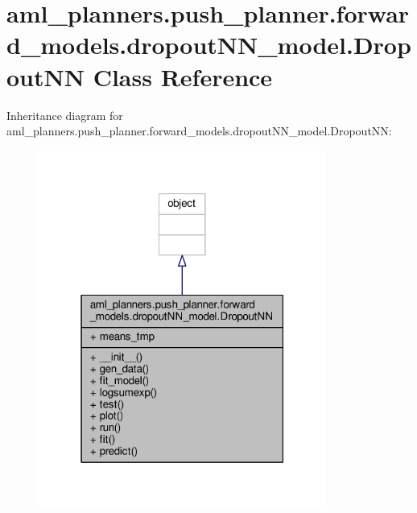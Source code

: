 \hypertarget{classaml__planners_1_1push__planner_1_1forward__models_1_1dropout_n_n__model_1_1_dropout_n_n}{\section{aml\-\_\-planners.\-push\-\_\-planner.\-forward\-\_\-models.\-dropout\-N\-N\-\_\-model.\-Dropout\-N\-N Class Reference}
\label{classaml__planners_1_1push__planner_1_1forward__models_1_1dropout_n_n__model_1_1_dropout_n_n}
}


Inheritance diagram for aml\-\_\-planners.\-push\-\_\-planner.\-forward\-\_\-models.\-dropout\-N\-N\-\_\-model.\-Dropout\-N\-N\-:
\nopagebreak
\begin{figure}[H]
\begin{center}
\leavevmode
\includegraphics[width=268pt]{classaml__planners_1_1push__planner_1_1forward__models_1_1dropout_n_n__model_1_1_dropout_n_n__inherit__graph}
\end{center}
\end{figure}


